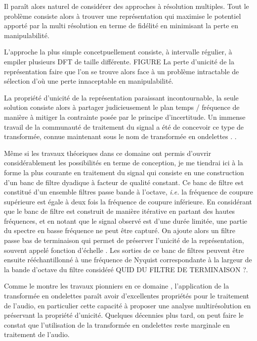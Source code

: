 Il paraît alors naturel de considérer des approches à résolution multiples. Tout le problème consiste alors à trouver une représentation qui maximise le potentiel apporté par la multi résolution en terme de fidélité en minimisant la perte en manipulabilité.

L'approche la plus simple concetpuellement consiste, à intervalle régulier, à \og empiler \fg plusieurs DFT de taille différente. FIGURE
La perte d'unicité de la représentation faire que l'on se trouve alors face à un problème intractable de sélection d'où une perte innaceptable en manipulabilité.

La propriété d'unicité de la représentation paraissant incontournable, la seule solution consiste alors à partager judicieusement le plan temps / fréquence de manière à mitiger la contrainte posée par le principe d'incertitude. Un immense travail de la communauté de traitement du signal a été de concevoir ce type de transformée, connue maintenant sous le nom de transformée en \og ondelettes \fg. \cite{mallat1989theory}.

Même si les travaux théoriques dans ce domaine ont permis d'ouvrir considérablement les possibilités en terme de conception, je me  tiendrai ici à la forme la plus courante en traitement du signal qui consiste en une construction d'un banc de filtre dyadique à facteur de qualité constant. Ce banc de filtre est constitué d'un ensemble filtres passe bande à l'octave, \textit{i.e.} la fréquence de coupure supérieure est égale à deux fois la fréquence de coupure inférieure. En considérant que le banc de filtre est construit de manière itérative en partant des hautes fréquences, et en notant que le signal observé est d'une durée limitée, une partie du spectre en basse fréquence ne peut être capturé. On ajoute alors un filtre passe bas \og de terminaison \fg qui permet de préserver l'unicité de la représentation, souvent appelé \og fonction d'échelle \fg. Les sorties de ce banc de filtres peuvent être ensuite rééchantillonné à une fréquence de Nyquist correspondante à la largeur de la bande d'octave du filtre considéré QUID DU FILTRE DE TERMINAISON ?.

Comme le montre les travaux pionniers en ce domaine \cite{kronland1987analysis}, l'application de la transformée en ondelettes paraît avoir d'excellentes propriétés pour le traitement de l'audio, en particulier cette capacité à proposer une analyse multirésolution en préservant la propriété d'unicité. Quelques décennies plus tard, on peut faire le constat que l'utilisation de la transformée en ondelettes reste marginale en traitement de l'audio.

